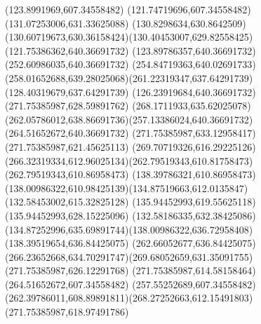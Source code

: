{{\lineto(123.8991969,607.34558482)
\lineto(121.74719696,607.34558482)
\closepath
\moveto(131.07253006,631.33625088)
\curveto(130.8298634,630.8642509)(130.60719673,630.36158424)(130.40453007,629.82558425)
\lineto(121.75386362,640.36691732)
\lineto(123.89786357,640.36691732)
\closepath
\moveto(252.60986035,640.36691732)
\curveto(254.84719363,640.02691733)(258.01652688,639.28025068)(261.22319347,637.64291739)
\lineto(128.40319679,637.64291739)
\lineto(126.23919684,640.36691732)
\closepath
\moveto(271.75385987,628.59891762)
\curveto(268.1711933,635.62025078)(262.05786012,638.86691736)(257.13386024,640.36691732)
\lineto(264.51652672,640.36691732)
\lineto(271.75385987,633.12958417)
\closepath
\moveto(271.75385987,621.45625113)
\curveto(269.70719326,616.29225126)(266.32319334,612.96025134)(262.79519343,610.81758473)
\lineto(262.79519343,610.86958473)
\lineto(138.39786321,610.86958473)
\curveto(138.00986322,610.98425139)(134.87519663,612.0135847)(132.58453002,615.32825128)
\lineto(135.94452993,619.55625118)
\lineto(135.94452993,628.15225096)
\lineto(132.58186335,632.38425086)
\curveto(134.87252996,635.69891744)(138.00986322,636.72958408)(138.39519654,636.84425075)
\lineto(262.66052677,636.84425075)
\curveto(266.23652668,634.70291747)(269.68052659,631.35091755)(271.75385987,626.12291768)
\closepath
\moveto(271.75385987,614.58158464)
\lineto(264.51652672,607.34558482)
\lineto(257.55252689,607.34558482)
\curveto(262.39786011,608.89891811)(268.27252663,612.15491803)(271.75385987,618.97491786)
\closepath
}
}
{
}
{
}
